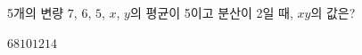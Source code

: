 5개의 변량 $7$, $6$, $5$, $x$, $y$의 평균이 5이고 분산이 2일 때, $xy$의 값은?
\begin{choices32}{$6$}{$8$}{$10$}{$12$}{$14$}\end{choices32}
